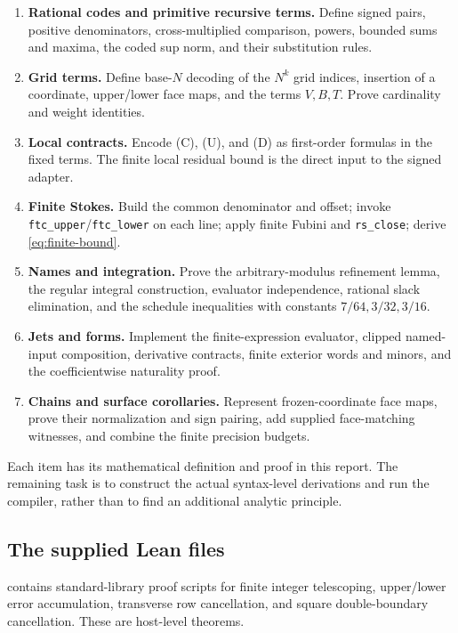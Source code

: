 \begin{enumerate}
\item \textbf{Rational codes and primitive recursive terms.}
Define signed pairs, positive denominators, cross-multiplied
comparison, powers, bounded sums and maxima, the coded sup norm,
and their substitution rules.
\item \textbf{Grid terms.}
Define base-$N$ decoding of the $N^k$ grid indices, insertion of a
coordinate, upper/lower face maps, and the terms $V,B,T$.
Prove cardinality and weight identities.
\item \textbf{Local contracts.}
Encode (C), (U), and (D) as first-order formulas in the fixed terms.
The finite local residual bound is the direct input to the signed
adapter.
\item \textbf{Finite Stokes.}
Build the common denominator and offset; invoke
\texttt{ftc\_upper}/\texttt{ftc\_lower} on each line;
apply finite Fubini and \texttt{rs\_close};
derive \eqref{eq:finite-bound}.
\item \textbf{Names and integration.}
Prove the arbitrary-modulus refinement lemma, the regular integral
construction, evaluator independence, rational slack elimination,
and the schedule inequalities with constants $7/64,3/32,3/16$.
\item \textbf{Jets and forms.}
Implement the finite-expression evaluator, clipped named-input
composition, derivative contracts, finite exterior words and
minors, and the coefficientwise naturality proof.
\item \textbf{Chains and surface corollaries.}
Represent frozen-coordinate face maps, prove their normalization
and sign pairing, add supplied face-matching witnesses, and
combine the finite precision budgets.
\end{enumerate}

Each item has its mathematical definition and proof in this report.
The remaining task is to construct the actual syntax-level derivations
and run the compiler, rather than to find an additional analytic
principle.

\subsection{The supplied Lean files}

 contains standard-library proof scripts for
finite integer telescoping, upper/lower error accumulation, transverse
row cancellation, and square double-boundary cancellation. These
are host-level theorems.

